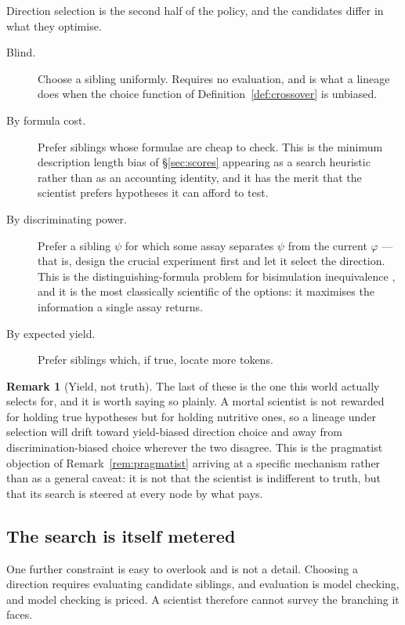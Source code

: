 \documentclass[11pt]{article}
\theoremstyle{plain}
\theoremstyle{definition}
\newtheorem{remark}[theorem]{Remark}
\begin{document}
Direction selection is the second half of the policy, and the candidates differ in what they optimise.

\begin{description}
\item[Blind.] Choose a sibling uniformly. Requires no evaluation, and is what a lineage does when the
choice function of Definition~\ref{def:crossover} is unbiased.

\item[By formula cost.] Prefer siblings whose formulae are cheap to check. This is the minimum
description length bias of \S\ref{sec:scores} appearing as a search heuristic rather than as an
accounting identity, and it has the merit that the scientist prefers hypotheses it can afford to test.

\item[By discriminating power.] Prefer a sibling $\psi$ for which some assay separates $\psi$ from the
current $\varphi$ --- that is, design the crucial experiment first and let it select the direction.
This is the distinguishing-formula problem for bisimulation inequivalence \cite{Cleaveland}, and it is
the most classically scientific of the options: it maximises the information a single assay returns.

\item[By expected yield.] Prefer siblings which, if true, locate more tokens.
\end{description}

\begin{remark}[Yield, not truth]
\label{rem:yieldbias}
The last of these is the one this world actually selects for, and it is worth saying so plainly. A
mortal scientist is not rewarded for holding true hypotheses but for holding nutritive ones, so a
lineage under selection will drift toward yield-biased direction choice and away from
discrimination-biased choice wherever the two disagree. This is the pragmatist objection of
Remark~\ref{rem:pragmatist} arriving at a specific mechanism rather than as a general caveat: it is not
that the scientist is indifferent to truth, but that its search is steered at every node by what pays.
\end{remark}

\subsection{The search is itself metered}

One further constraint is easy to overlook and is not a detail. Choosing a direction requires
evaluating candidate siblings, and evaluation is model checking, and model checking is priced. A
scientist therefore cannot survey the branching it faces.
\end{document}
